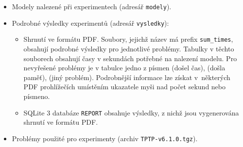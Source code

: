 \begin{itemize}
\item Modely nalezené při experimentech (adresář \texttt{modely}).
\item Podrobné výsledky experimentů (adresář \texttt{vysledky}):
  \begin{itemize}
  \item Shrnutí ve formátu PDF. Soubory, jejichž název má
    prefix \texttt{sum\_times}, obsahují podrobné výsledky
    pro jednotlivé problémy. Tabulky v těchto souborech obsahují časy
    v sekundách potřebné na nalezení modelu. Pro nevyřešené problémy
    je v tabulce jedno z písmen  (došel čas),  (došla paměť),
     (jiný problém). Podrobnější informace lze získat
    v~některých PDF prohlížečích umístěním ukazatele myši
    nad počet sekund nebo písmeno.
  \item SQLite 3 databáze \texttt{REPORT} obsahuje výsledky, z nichž
    jsou vygenerována shrnutí ve formátu PDF.
  \end{itemize}
\item Problémy použité pro experimenty (archiv \texttt{TPTP-v6.1.0.tgz}).
\end{itemize}
